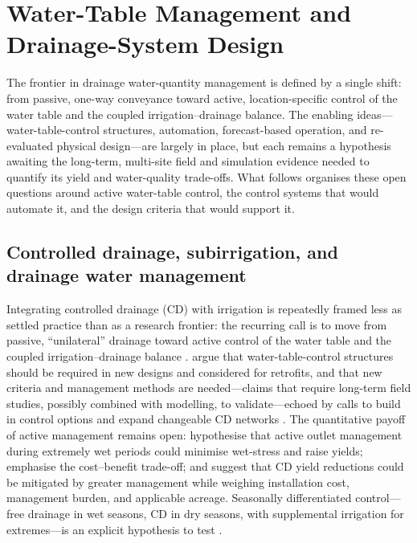 \section{Water-Table Management and Drainage-System Design}

The frontier in drainage water-quantity management is defined by a single
shift: from passive, one-way conveyance toward active, location-specific
control of the water table and the coupled irrigation--drainage balance. The
enabling ideas---water-table-control structures, automation, forecast-based
operation, and re-evaluated physical design---are largely in place, but each
remains a hypothesis awaiting the long-term, multi-site field and simulation
evidence needed to quantify its yield and water-quality trade-offs. What
follows organises these open questions around active water-table control, the
control systems that would automate it, and the design criteria that would
support it.

\subsection{Controlled drainage, subirrigation, and drainage water management}

Integrating controlled drainage (CD) with irrigation is repeatedly framed less
as settled practice than as a research frontier: the recurring call is to move
from passive, ``unilateral'' drainage toward active control of the water table
and the coupled irrigation--drainage balance
\parencite{Ayars2006b,Kesicka2023b,Ritzema2023}. \textcite{Ayars2006b} argue
that water-table-control structures should be required in new designs and
considered for retrofits, and that new criteria and management methods are
needed---claims that require long-term field studies, possibly combined with
modelling, to validate---echoed by calls to build in control options and expand
changeable CD networks \parencite{Dukhovny2018,Mahmoud2021,Strock2011}. The
quantitative payoff of active management remains open: \textcite{Watkins2024}
hypothesise that active outlet management during extremely wet periods could
minimise wet-stress and raise yields; \textcite{Saadat2017} emphasise the
cost--benefit trade-off; and \textcite{Helmers2012} suggest that CD yield
reductions could be mitigated by greater management while weighing installation
cost, management burden, and applicable acreage. Seasonally differentiated
control---free drainage in wet seasons, CD in dry seasons, with supplemental
irrigation for extremes---is an explicit hypothesis to test
\parencite{Asgari2021}.

